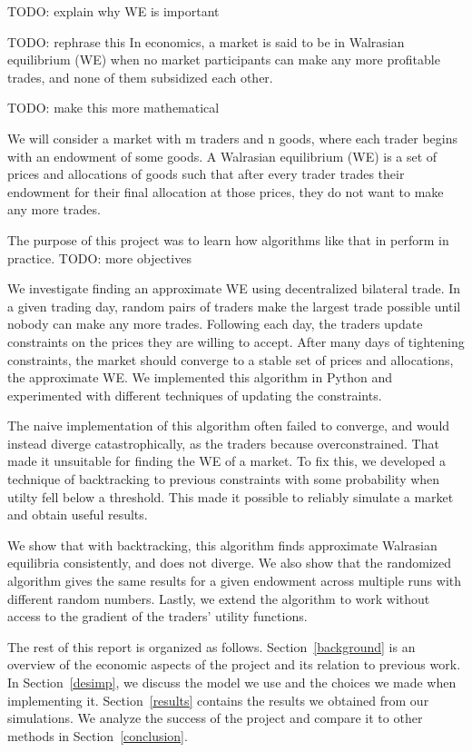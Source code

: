 \documentclass[12pt,a4paper,titlepage]{article}
\begin{document}
TODO: explain why WE is important

TODO: rephrase this
In economics, a market is said to be in Walrasian equilibrium (WE) when no market participants can make any more profitable trades, and none of them subsidized each other. 

TODO: make this more mathematical

We will consider a market with m traders and n goods, where each trader begins with an endowment of some goods.
A Walrasian equilibrium (WE) is a set of prices and allocations of goods such that after every trader trades their endowment for their final allocation at those prices, they do not want to make any more trades.

The purpose of this project was to learn how algorithms like that in \cite{crockett} perform in practice.
TODO: more objectives

We investigate finding an approximate WE using decentralized bilateral trade.
In a given trading day, random pairs of traders make the largest trade possible until nobody can make any more trades. 
Following each day, the traders update constraints on the prices they are willing to accept.
After many days of tightening constraints, the market should converge to a stable set of prices and allocations, the approximate WE.
We implemented this algorithm in Python and experimented with different techniques of updating the constraints.

The naive implementation of this algorithm often failed to converge, and would instead diverge catastrophically, as the traders because overconstrained.
That made it unsuitable for finding the WE of a market.
To fix this, we developed a technique of backtracking to previous constraints with some probability when utilty fell below a threshold.
This made it possible to reliably simulate a market and obtain useful results.

We show that with backtracking, this algorithm finds approximate Walrasian equilibria consistently, and does not diverge.
We also show that the randomized algorithm gives the same results for a given endowment across multiple runs with different random numbers.
Lastly, we extend the algorithm to work without access to the gradient of the traders' utility functions.


The rest of this report is organized as follows.
Section~\ref{background} is an overview of the economic aspects of the project and its relation to previous work.
In Section~\ref{desimp}, we discuss the model we use and the choices we made when implementing it.
Section~\ref{results} contains the results we obtained from our simulations.
We analyze the success of the project and compare it to other methods in Section~\ref{conclusion}. 
\end{document}
